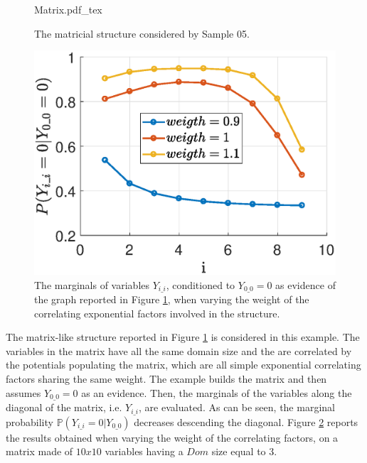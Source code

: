 \begin{figure}
	\centering
\def\svgwidth{0.55 \textwidth}
{Matrix.pdf_tex} 
\caption{The matricial structure considered by Sample 05.}
\label{fig:sample_04:1}
\end{figure}

\begin{figure}
	\centering
\includegraphics[width=0.48\columnwidth]{../Chapter_additional/03_Samples/image_04_05/Matrix_marginals.eps}
\caption{The marginals of variables $Y_{i\_i}$, conditioned to $Y_{0\_0}= 0$ as evidence of the graph reported in Figure \ref{fig:sample_04:1}, when varying the weight of the correlating exponential factors involved in the structure.}
\label{fig:sample_04:2}
\end{figure} 

The matrix-like structure reported in Figure \ref{fig:sample_04:1} is considered in this example. The variables in the matrix have all the same domain size and the are correlated by the potentials populating the matrix, which are all simple exponential correlating factors sharing the same weight.
The example builds the matrix and then assumes $Y_{0\_0} = 0$ as an evidence. Then, the marginals of the variables along the diagonal of the matrix, i.e. $Y_{i\_i}$, are evaluated. As can be seen, the marginal probability $\mathbb{P}(Y_{i\_i} = 0 | Y_{0\_0})$ decreases descending the diagonal. Figure \ref{fig:sample_04:2} reports the results obtained when varying the weight of the correlating factors, on a matrix made of $10x10$ variables having a $Dom$ size equal to $3$.